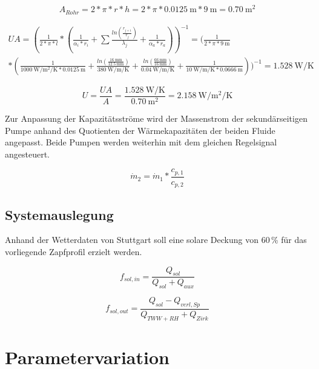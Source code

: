\begin{equation}
	\label{eq:Arohr}
	A_{Rohr} = 2*\pi*r*h = 2*\pi*\SI{0,0125}{\meter}*\SI{9}{\meter}=\SI{0,70}{\square\meter}
\end{equation}

\begin{multline}
	\label{eq:UA}
UA = (\frac{1}{2*\pi*l}*(\frac{1}{\alpha_i*r_i}+\sum\frac{ln(\frac{r_{j+1}}{r_j})}{\lambda_j}+\frac{1}{\alpha_a*r_a}))^{-1} = (\frac{1}{2*\pi*\SI{9}{\meter}}\\*(\frac{1}{\SI{1000}{\watt\per\square\meter\per\kelvin}*\SI{0,0125}{\meter}}+\frac{ln(\frac{\SI{16}{\milli\meter}}{\SI{12,5}{\milli\meter}})}{\SI{380}{\watt\per\meter\per\kelvin}}+\frac{ln(\frac{\SI{66}{\milli\meter}}{\SI{16}{\milli\meter}})}{\SI{0,04}{\watt\per\meter\per\kelvin}}+\frac{1}{\SI{10}{\watt\per\meter\per\kelvin}*\SI{0,0666}{\meter}}))^{-1}=\SI{1,528}{\watt\per\kelvin}
\end{multline}


\begin{equation}
	\label{eq:U}
	U=\frac{UA}{A}=\frac{\SI{1,528}{\watt\per\kelvin}}{\SI{0,70}{\square\meter}}=\SI{2,158}{\watt\per\square\meter\per\kelvin}
\end{equation}


Zur Anpassung der Kapazitätsströme wird der Massenstrom der sekundärseitigen Pumpe anhand des Quotienten der Wärmekapazitäten der beiden Fluide angepasst. Beide Pumpen werden weiterhin mit dem gleichen Regelsignal angesteuert.

\begin{equation}
	\label{eq:dotm}
	\dot m_{2}=\dot m_{1}*\frac{c_{p,1}}{c_{p,2}}
\end{equation}


\subsection{Systemauslegung}
Anhand der Wetterdaten von Stuttgart soll eine solare Deckung von 60\,\% für das vorliegende Zapfprofil erzielt werden.

\begin{equation}
	\label{eq:fsolin}
	f_{sol,in} = \frac{Q_{sol}}{Q_{sol}+Q_{aux}}
\end{equation}

\begin{equation}
	\label{eq:}
	f_{sol,out} = \frac{Q_{sol}-Q_{verl,Sp}}{Q_{TWW+RH}+Q_{Zirk}}
\end{equation}
\section{Parametervariation}
